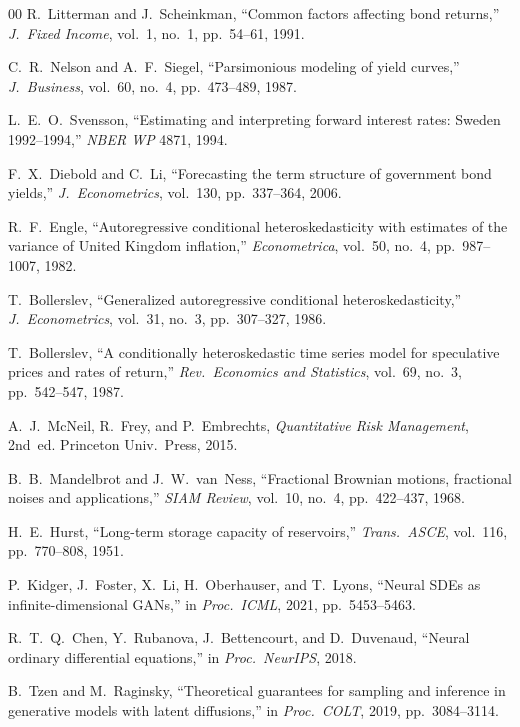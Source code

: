 \documentclass[conference]{IEEEtran}
\begin{document}
\begin{thebibliography}{00}
R.~Litterman and J.~Scheinkman, ``Common factors affecting bond returns,''
\emph{J.~Fixed Income}, vol.~1, no.~1, pp.~54--61, 1991.

C.~R.~Nelson and A.~F.~Siegel, ``Parsimonious modeling of yield curves,''
\emph{J.~Business}, vol.~60, no.~4, pp.~473--489, 1987.

L.~E.~O.~Svensson, ``Estimating and interpreting forward interest rates: Sweden 1992--1994,''
\emph{NBER WP} 4871, 1994.

F.~X.~Diebold and C.~Li, ``Forecasting the term structure of government bond yields,''
\emph{J.~Econometrics}, vol.~130, pp.~337--364, 2006.

R.~F.~Engle, ``Autoregressive conditional heteroskedasticity with estimates of the variance of United Kingdom inflation,''
\emph{Econometrica}, vol.~50, no.~4, pp.~987--1007, 1982.

T.~Bollerslev, ``Generalized autoregressive conditional heteroskedasticity,''
\emph{J.~Econometrics}, vol.~31, no.~3, pp.~307--327, 1986.

T.~Bollerslev, ``A conditionally heteroskedastic time series model for speculative prices and rates of return,''
\emph{Rev.~Economics and Statistics}, vol.~69, no.~3, pp.~542--547, 1987.

A.~J.~McNeil, R.~Frey, and P.~Embrechts, \emph{Quantitative Risk Management}, 2nd~ed. Princeton Univ.~Press, 2015.

B.~B.~Mandelbrot and J.~W.~van~Ness, ``Fractional Brownian motions, fractional noises and applications,''
\emph{SIAM Review}, vol.~10, no.~4, pp.~422--437, 1968.

H.~E.~Hurst, ``Long-term storage capacity of reservoirs,''
\emph{Trans.~ASCE}, vol.~116, pp.~770--808, 1951.

P.~Kidger, J.~Foster, X.~Li, H.~Oberhauser, and T.~Lyons, ``Neural SDEs as infinite-dimensional GANs,''
in \emph{Proc.~ICML}, 2021, pp.~5453--5463.

R.~T.~Q.~Chen, Y.~Rubanova, J.~Bettencourt, and D.~Duvenaud, ``Neural ordinary differential equations,''
in \emph{Proc.~NeurIPS}, 2018.

B.~Tzen and M.~Raginsky, ``Theoretical guarantees for sampling and inference in generative models with latent diffusions,''
in \emph{Proc.~COLT}, 2019, pp.~3084--3114.


\end{thebibliography}
\end{document}
